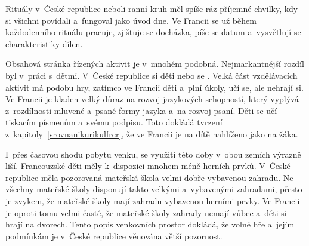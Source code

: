 	Rituály v~České republice neboli ranní kruh měl spíše ráz příjemné chvilky, kdy si všichni povídali a~fungoval jako úvod dne. Ve Francii se už během každodenního rituálu pracuje, zjištuje se docházka, píše se datum a~vysvětlují se charakteristiky dílen.

	Obsahová stránka řízených aktivit je v~mnohém podobná. Nejmarkantnější rozdíl byl v~práci s~dětmi. V~České republice si děti  nebo se . Velká část vzdělávacích aktivit má podobu hry, zatímco ve Francii děti  a~plní úkoly, učí se, ale nehrají si. Ve Francii je kladen velký důraz na rozvoj jazykových schopností, který vyplývá z~rozdílnosti mluvené a~psané formy jazyka a~na rozvoj psaní. Děti se učí tiskacím písmenům a~svému podpisu. Toto dokládá tvrzení z~kapitoly~\ref{srovnanikurikulfrcr}, že ve Francii je na dítě nahlíženo jako na žáka.

	I~přes časovou shodu pobytu venku, se využití této doby v~obou zemích výrazně liší. Francouzské děti měly k~dispozici mnohem méně herních prvků. V~České republice měla pozorovaná mateřská škola velmi dobře vybavenou zahradu. Ne všechny mateřské školy disponují takto velkými a~vybavenými zahradami, přesto je zvykem, že mateřské školy mají zahradu vybavenou herními prvky. Ve Francii je oproti tomu velmi časté, že mateřské školy zahrady nemají vůbec a~děti si hrají na dvorech. Tento popis venkovních prostor dokládá, že volné hře a~jejím podmínkám je v~České republice věnována větší pozornost.



		
	


